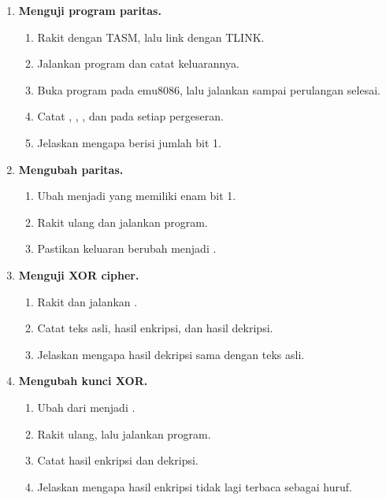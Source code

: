 \begin{enumerate}
    \item \textbf{Menguji program paritas.}
    \begin{enumerate}
        \item Rakit  dengan TASM, lalu link
              dengan TLINK.
        \item Jalankan program dan catat keluarannya.
        \item Buka program pada emu8086, lalu jalankan
               sampai perulangan selesai.
        \item Catat , , , dan 
              pada setiap pergeseran.
        \item Jelaskan mengapa  berisi jumlah bit 1.
    \end{enumerate}

    \item \textbf{Mengubah paritas.}
    \begin{enumerate}
        \item Ubah  menjadi  yang memiliki
              enam bit 1.
        \item Rakit ulang dan jalankan program.
        \item Pastikan keluaran berubah menjadi .
    \end{enumerate}

    \item \textbf{Menguji XOR cipher.}
    \begin{enumerate}
        \item Rakit dan jalankan .
        \item Catat teks asli, hasil enkripsi, dan hasil dekripsi.
        \item Jelaskan mengapa hasil dekripsi sama dengan teks asli.
    \end{enumerate}

    \item \textbf{Mengubah kunci XOR.}
    \begin{enumerate}
        \item Ubah  dari  menjadi .
        \item Rakit ulang, lalu jalankan program.
        \item Catat hasil enkripsi dan dekripsi.
        \item Jelaskan mengapa hasil enkripsi tidak lagi terbaca
              sebagai huruf.
    \end{enumerate}


\end{enumerate}
